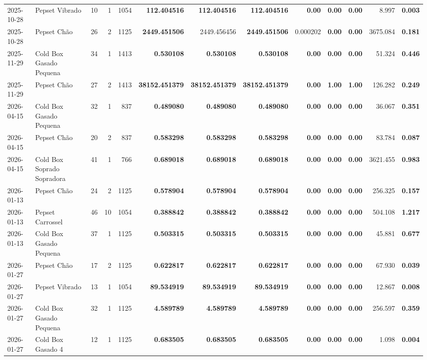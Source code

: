 {\begin{center}
{\begin{tabular}{@{}llrrrrrrrrrrr@{}}
2025-10-28 & Pepset Vibrado & 10 & 1 & 1054 & \textbf{112.404516} & \textbf{112.404516} & \textbf{112.404516} & \textbf{0.00} & \textbf{0.00} & \textbf{0.00} & 8.997 & \textbf{0.003} \\
2025-10-28 & Pepset Chão & 26 & 2 & 1125 & \textbf{2449.451506} & 2449.456456 & \textbf{2449.451506} & 0.000202 & \textbf{0.00} & \textbf{0.00} & 3675.084 & \textbf{0.181} \\
2025-11-29 & Cold Box Gasado Pequena & 34 & 1 & 1413 & \textbf{0.530108} & \textbf{0.530108} & \textbf{0.530108} & \textbf{0.00} & \textbf{0.00} & \textbf{0.00} & 51.324 & \textbf{0.446} \\
2025-11-29 & Pepset Chão & 27 & 2 & 1413 & \textbf{38152.451379} & \textbf{38152.451379} & \textbf{38152.451379} & \textbf{0.00} & \textbf{1.00} & \textbf{1.00} & 126.282 & \textbf{0.249} \\
2026-04-15 & Cold Box Gasado Pequena & 32 & 1 & 837 & \textbf{0.489080} & \textbf{0.489080} & \textbf{0.489080} & \textbf{0.00} & \textbf{0.00} & \textbf{0.00} & 36.067 & \textbf{0.351} \\
2026-04-15 & Pepset Chão & 20 & 2 & 837 & \textbf{0.583298} & \textbf{0.583298} & \textbf{0.583298} & \textbf{0.00} & \textbf{0.00} & \textbf{0.00} & 83.784 & \textbf{0.087} \\
2026-04-15 & Cold Box Soprado Sopradora & 41 & 1 & 766 & \textbf{0.689018} & \textbf{0.689018} & \textbf{0.689018} & \textbf{0.00} & \textbf{0.00} & \textbf{0.00} & 3621.455 & \textbf{0.983} \\
2026-01-13 & Pepset Chão & 24 & 2 & 1125 & \textbf{0.578904} & \textbf{0.578904} & \textbf{0.578904} & \textbf{0.00} & \textbf{0.00} & \textbf{0.00} & 256.325 & \textbf{0.157} \\
2026-01-13 & Pepset Carrossel & 46 & 10 & 1054 & \textbf{0.388842} & \textbf{0.388842} & \textbf{0.388842} & \textbf{0.00} & \textbf{0.00} & \textbf{0.00} & 504.108 & \textbf{1.217} \\
2026-01-13 & Cold Box Gasado Pequena & 37 & 1 & 1125 & \textbf{0.503315} & \textbf{0.503315} & \textbf{0.503315} & \textbf{0.00} & \textbf{0.00} & \textbf{0.00} & 45.881 & \textbf{0.677} \\
2026-01-27 & Pepset Chão & 17 & 2 & 1125 & \textbf{0.622817} & \textbf{0.622817} & \textbf{0.622817} & \textbf{0.00} & \textbf{0.00} & \textbf{0.00} & 67.930 & \textbf{0.039} \\
2026-01-27 & Pepset Vibrado & 13 & 1 & 1054 & \textbf{89.534919} & \textbf{89.534919} & \textbf{89.534919} & \textbf{0.00} & \textbf{0.00} & \textbf{0.00} & 12.867 & \textbf{0.008} \\
2026-01-27 & Cold Box Gasado Pequena & 32 & 1 & 1125 & \textbf{4.589789} & \textbf{4.589789} & \textbf{4.589789} & \textbf{0.00} & \textbf{0.00} & \textbf{0.00} & 256.597 & \textbf{0.359} \\
2026-01-27 & Cold Box Gasado 4 & 12 & 1 & 1125 & \textbf{0.683505} & \textbf{0.683505} & \textbf{0.683505} & \textbf{0.00} & \textbf{0.00} & \textbf{0.00} & 1.098 & \textbf{0.004} \\
\bottomrule
\end{tabular}%
}
\end{center}
}
\vspace*{\fill}
